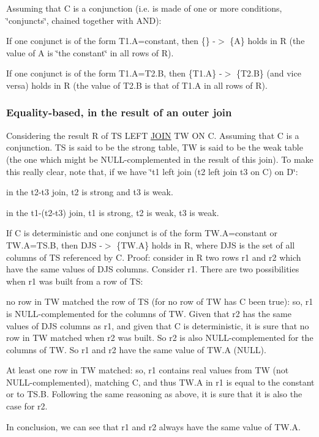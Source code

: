 Assuming that C is a conjunction (i.\+e. is made of one or more conditions, \char`\"{}conjuncts\char`\"{}, chained together with A\+ND)\+:
\begin{DoxyItemize}
\item If one conjunct is of the form T1.\+A=constant, then \{\} -\/$>$ \{A\} holds in R (the value of A is \char`\"{}the constant\char`\"{} in all rows of R).
\item If one conjunct is of the form T1.\+A=T2.\+B, then \{T1.\+A\} -\/$>$ \{T2.\+B\} (and vice versa) holds in R (the value of T2.\+B is that of T1.\+A in all rows of R).
\end{DoxyItemize}\hypertarget{group__AGGREGATE__CHECKS_OUTEREQ}{}\subsubsection{Equality-\/based, in the result of an outer join}\label{group__AGGREGATE__CHECKS_OUTEREQ}
Considering the result R of TS L\+E\+FT \mbox{\hyperlink{classJOIN}{J\+O\+IN}} TW ON C. Assuming that C is a conjunction. TS is said to be the strong table, TW is said to be the weak table (the one which might be N\+U\+LL-\/complemented in the result of this join). To make this really clear, note that, if we have \char`\"{}t1 left join (t2 left join t3 on C) on D\char`\"{}\+:
\begin{DoxyItemize}
\item in the t2-\/t3 join, t2 is strong and t3 is weak.
\item in the t1-\/(t2-\/t3) join, t1 is strong, t2 is weak, t3 is weak.
\end{DoxyItemize}

If C is deterministic and one conjunct is of the form T\+W.\+A=constant or T\+W.\+A=T\+S.\+B, then D\+JS -\/$>$ \{T\+W.\+A\} holds in R, where D\+JS is the set of all columns of TS referenced by C. Proof\+: consider in R two rows r1 and r2 which have the same values of D\+JS columns. Consider r1. There are two possibilities when r1 was built from a row of TS\+:
\begin{DoxyItemize}
\item no row in TW matched the row of TS (for no row of TW has C been true)\+: so, r1 is N\+U\+LL-\/complemented for the columns of TW. Given that r2 has the same values of D\+JS columns as r1, and given that C is deterministic, it is sure that no row in TW matched when r2 was built. So r2 is also N\+U\+LL-\/complemented for the columns of TW. So r1 and r2 have the same value of T\+W.\+A (N\+U\+LL).
\item At least one row in TW matched\+: so, r1 contains real values from TW (not N\+U\+LL-\/complemented), matching C, and thus T\+W.\+A in r1 is equal to the constant or to T\+S.\+B. Following the same reasoning as above, it is sure that it is also the case for r2.
\item In conclusion, we can see that r1 and r2 always have the same value of T\+W.\+A.
\end{DoxyItemize}

